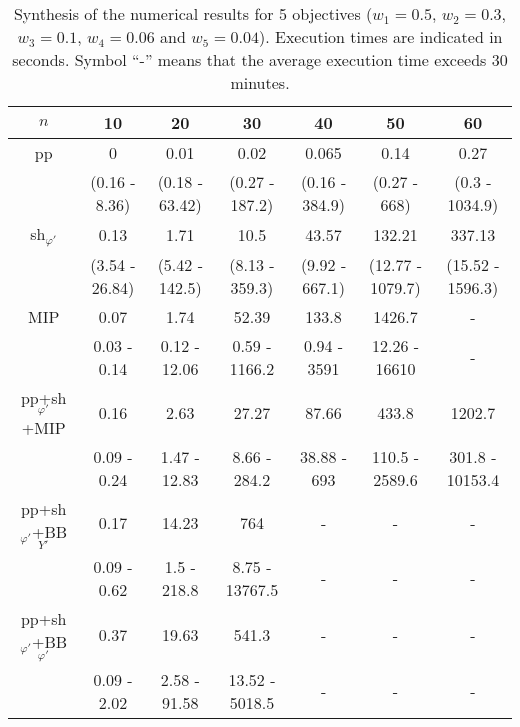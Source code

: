 \documentclass[final,3p,times]{elsarticle}
\begin{document}
\begin{table}[!h]
  \begin{center}
 {\small \begin{tabular}{|c|cccccc|}
   \hline
      \rule[1pt]{0pt}{13pt} 
   $n$ & 10&20&30&40&50&60 \\
    \hline
 pp  &0&0.01&0.02&0.065&0.14&0.27\\
    	  &(0.16 - 8.36)&(0.18 - 63.42)&(0.27 - 187.2)&(0.16 - 384.9)&(0.27 - 668)&(0.3 - 1034.9)\\
 sh$_{\varphi'}$& 0.13&1.71&10.5&43.57&132.21&337.13\\
    	  &(3.54 - 26.84)&(5.42 - 142.5)&(8.13 - 359.3)&(9.92 - 667.1)&(12.77 - 1079.7)&(15.52 - 1596.3)\\
    \hline
 MIP&0.07&1.74&52.39&133.8&1426.7&-\\
    &0.03 - 0.14&0.12 - 12.06&0.59 - 1166.2&0.94 - 3591&12.26 - 16610& - \\
  pp+sh$_{\varphi'}$+MIP &0.16&2.63&27.27&87.66&433.8&1202.7\\
      & 0.09 - 0.24&1.47 - 12.83&8.66 - 284.2&38.88 - 693&110.5 - 2589.6&301.8 - 10153.4\\
  pp+sh$_{\varphi'}$+BB$_{Y'}$& 0.17&14.23&764&-&-&-\\
 & 0.09 - 0.62&1.5 - 218.8&8.75 - 13767.5& - & - & - \\
pp+sh$_{\varphi'}$+BB$_{\varphi'}$& 0.37&19.63&541.3&-&-&-\\
    &0.09 - 2.02&2.58 - 91.58&13.52 - 5018.5& - & - & - \\
  \hline
       \end{tabular}
}
\end{center}
\caption{\label{tabPL2} Synthesis of the numerical results for 5 objectives ($w_1 = 0.5$, $w_2 = 0.3$,
  $w_3 = 0.1$, $w_4 = 0.06$ and $w_5 = 0.04$). Execution times are indicated in seconds. Symbol ``-'' means that the average execution time exceeds 30 minutes.}
\end{table}
\end{document}
